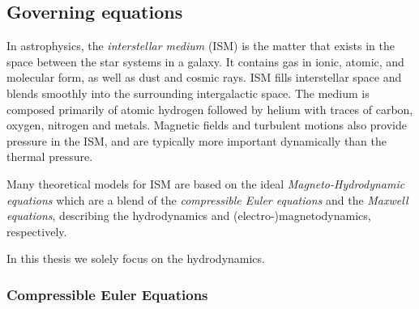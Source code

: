 \subsection{Governing equations}
\label{sec:governing-equations}

In astrophysics, the \emph{interstellar medium} (ISM) is the matter that exists
in the space between the star systems in a galaxy. It contains gas in ionic,
atomic, and molecular form, as well as dust and cosmic rays. ISM fills
interstellar space and blends smoothly into the surrounding intergalactic
space. The medium is composed primarily of atomic hydrogen followed by helium
with traces of carbon, oxygen, nitrogen and metals. Magnetic fields and
turbulent motions also provide pressure in the ISM, and are typically more
important dynamically than the thermal pressure.

Many theoretical models for ISM are based on the ideal
\emph{Magneto-Hydrodynamic equations} which are a blend of the \emph{compressible
Euler equations} and the \emph{Maxwell equations}, describing the hydrodynamics
and (electro-)magnetodynamics, respectively.

In this thesis we solely focus on the hydrodynamics.

\subsubsection{Compressible Euler Equations}

